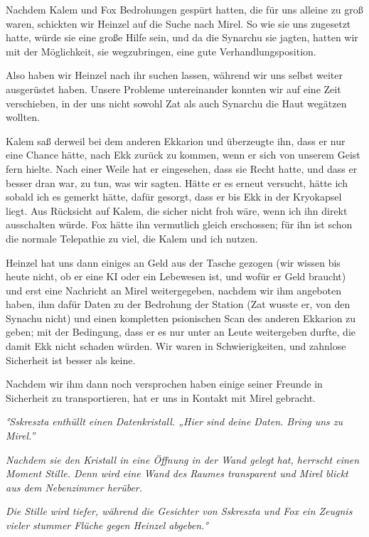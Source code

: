 \documentclass[11pt]{article}
\begin{document}
Nachdem Kalem und Fox Bedrohungen gespürt hatten, die für uns alleine zu
groß waren, schickten wir Heinzel auf die Suche nach Mirel. So wie sie
uns zugesetzt hatte, würde sie eine große Hilfe sein, und da die
Synarchu sie jagten, hatten wir mit der Möglichkeit, sie wegzubringen,
eine gute Verhandlungsposition.

Also haben wir Heinzel nach ihr suchen lassen, während wir uns selbst
weiter ausgerüstet haben. Unsere Probleme untereinander konnten wir auf
eine Zeit verschieben, in der uns nicht sowohl Zat als auch Synarchu die
Haut wegätzen wollten.

Kalem saß derweil bei dem anderen Ekkarion und überzeugte ihn, dass er
nur eine Chance hätte, nach Ekk zurück zu kommen, wenn er sich von
unserem Geist fern hielte. Nach einer Weile hat er eingesehen, dass sie
Recht hatte, und dass er besser dran war, zu tun, was wir sagten. Hätte
er es erneut versucht, hätte ich sobald ich es gemerkt hätte, dafür
gesorgt, dass er bis Ekk in der Kryokapsel liegt. Aus Rücksicht auf
Kalem, die sicher nicht froh wäre, wenn ich ihn direkt ausschalten
würde. Fox hätte ihn vermutlich gleich erschossen; für ihn ist schon die
normale Telepathie zu viel, die Kalem und ich nutzen.

Heinzel hat uns dann einiges an Geld aus der Tasche gezogen (wir wissen
bis heute nicht, ob er eine KI oder ein Lebewesen ist, und wofür er Geld
braucht) und erst eine Nachricht an Mirel weitergegeben, nachdem wir ihm
angeboten haben, ihm dafür Daten zu der Bedrohung der Station (Zat
wusste er, von den Synachu nicht) und einen kompletten psionischen Scan
des anderen Ekkarion zu geben; mit der Bedingung, dass er es nur unter
an Leute weitergeben durfte, die damit Ekk nicht schaden würden. Wir
waren in Schwierigkeiten, und zahnlose Sicherheit ist besser als keine.

Nachdem wir ihm dann noch versprochen haben einige seiner Freunde in
Sicherheit zu transportieren, hat er uns in Kontakt mit Mirel gebracht.

\emph{°Sskreszta enthüllt einen Datenkristall. „Hier sind deine Daten.
Bring uns zu Mirel.''}

\emph{Nachdem sie den Kristall in eine Öffnung in der Wand gelegt hat,
herrscht einen Moment Stille. Denn wird eine Wand des Raumes transparent
und Mirel blickt aus dem Nebenzimmer herüber.}

\emph{Die Stille wird tiefer, während die Gesichter von Sskreszta und
Fox ein Zeugnis vieler stummer Flüche gegen Heinzel abgeben.°}
\end{document}
